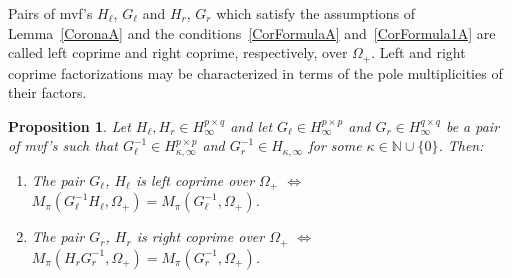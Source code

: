 \documentclass[12pt,twoside,a4paper]{amsart}
\newtheorem{proposition}[thm]{Proposition}
\theoremstyle{definition}
\numberwithin{equation}{section}
\begin{document}
Pairs of mvf's $H_\ell$, $G_\ell$ and $H_r$, $G_r$ which satisfy the
assumptions of Lemma~\ref{CoronaA} and the
conditions~\eqref{CorFormulaA} and~\eqref{CorFormula1A} are called
left coprime and right coprime, respectively, over $\Omega_+$. Left
and right coprime factorizations may be characterized in terms of
the pole
 multiplicities of their factors.
\begin{proposition}\label{Prop:5.1}  Let $H_\ell, H_r\in
H_{\infty}^{p\times q}$ and let  $G_\ell\in H_{\infty}^{p\times p}$ and
$G_r\in H_{\infty}^{q\times q}$ be a pair
 of mvf's such that $
G_\ell^{-1}\in H_{\kappa,\infty}^{p\times p}$ and
$G_r^{-1}\in H_{\kappa,\infty}$ for some
$\kappa\in{{\mathbb N}}\cup\{0\}$. Then:
\begin{enumerate}
\item[(i)] The pair $G_\ell$, $H_\ell$ is left coprime over $\Omega_+$
$\Longleftrightarrow$ $M_{\pi} (G_\ell^{-1}H_\ell, \Omega_+)=M_{\pi}
(G_\ell^{-1}, \Omega_+)$.
\vskip 6pt
\item[(ii)] The pair $G_r$, $H_r$ is right
coprime over $\Omega_+$ $\Longleftrightarrow$ $M_{\pi} (H_rG_r^{-1},
\Omega_+)=M_{\pi} (G_r^{-1}, \Omega_+)$.
\end{enumerate}
\end{proposition}
\end{document}
